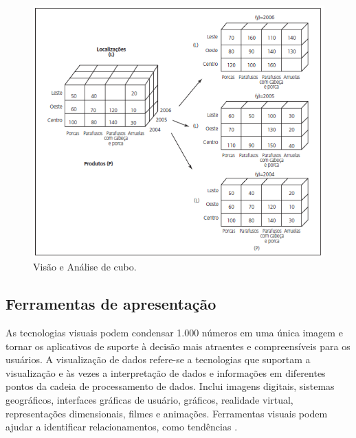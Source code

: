 \begin{figure}[htb]
	\caption{\label{fig_cuboturban}Visão e Análise de cubo.}
	\begin{center}
	    \includegraphics[scale=0.9]{Imagens/figura - cubo olap turban.png}
	\end{center}
\end{figure}
\subsection{Ferramentas de apresentação} \label{subD-relatorios}
As tecnologias visuais podem condensar 1.000 números em uma única imagem e tornar os aplicativos de suporte à decisão mais atraentes e compreensíveis para os usuários. A visualização de dados refere-se a tecnologias que suportam a visualização e às vezes a interpretação de dados e informações em diferentes pontos da cadeia de processamento de dados. Inclui imagens digitais, sistemas geográficos, interfaces gráficas de usuário, gráficos, realidade virtual, representações dimensionais, filmes e animações. Ferramentas visuais podem ajudar a identificar relacionamentos, como tendências \cite{turban2008}.
